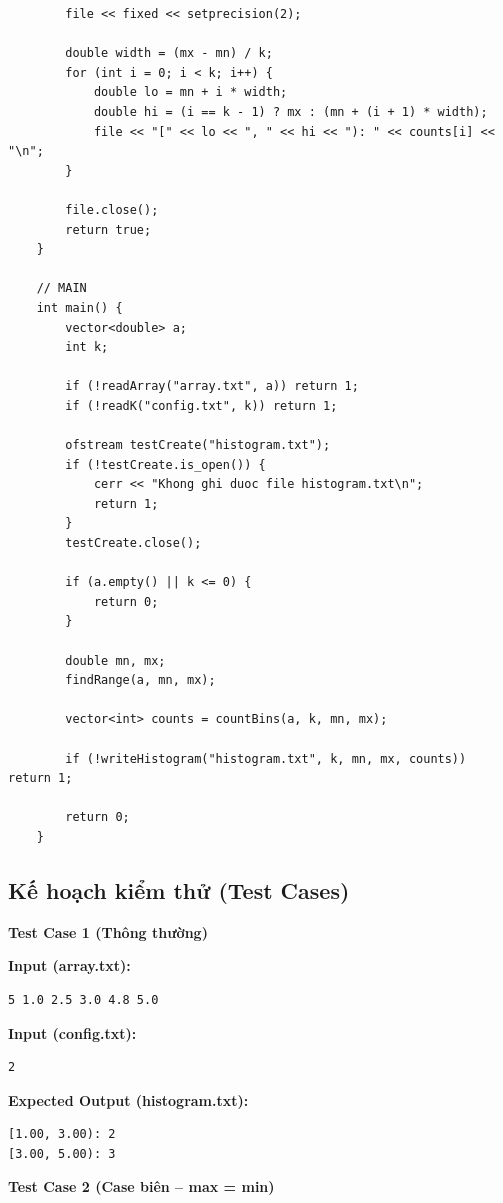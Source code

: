 \begin{lstlisting}
        file << fixed << setprecision(2);

        double width = (mx - mn) / k;
        for (int i = 0; i < k; i++) {
            double lo = mn + i * width;
            double hi = (i == k - 1) ? mx : (mn + (i + 1) * width);
            file << "[" << lo << ", " << hi << "): " << counts[i] << "\n";
        }

        file.close();
        return true;
    }

    // MAIN
    int main() {
        vector<double> a;
        int k;

        if (!readArray("array.txt", a)) return 1;
        if (!readK("config.txt", k)) return 1;

        ofstream testCreate("histogram.txt");
        if (!testCreate.is_open()) {
            cerr << "Khong ghi duoc file histogram.txt\n";
            return 1;
        }
        testCreate.close();

        if (a.empty() || k <= 0) {
            return 0;
        }

        double mn, mx;
        findRange(a, mn, mx);

        vector<int> counts = countBins(a, k, mn, mx);

        if (!writeHistogram("histogram.txt", k, mn, mx, counts)) return 1;

        return 0;
    }
\end{lstlisting}

\subsection{Kế hoạch kiểm thử (Test Cases)}

\textbf{Test Case 1 (Thông thường)}

\textbf{Input (array.txt):}
\begin{lstlisting}
5 1.0 2.5 3.0 4.8 5.0
\end{lstlisting}

\textbf{Input (config.txt):}
\begin{lstlisting}
2
\end{lstlisting}

\textbf{Expected Output (histogram.txt):}
\begin{lstlisting}
[1.00, 3.00): 2
[3.00, 5.00): 3
\end{lstlisting}

\vspace{0.5cm}

\textbf{Test Case 2 (Case biên -- max = min)}

